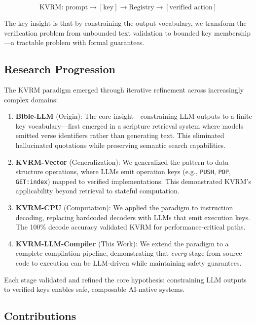 \documentclass[11pt,a4paper]{article}
\begin{document}
\begin{equation}
\text{KVRM: } \text{prompt} \rightarrow [\text{key}] \rightarrow \text{Registry} \rightarrow [\text{verified action}]
\end{equation}

The key insight is that by constraining the output vocabulary, we transform the verification problem from unbounded text validation to bounded key membership---a tractable problem with formal guarantees.

\subsection{Research Progression}

The KVRM paradigm emerged through iterative refinement across increasingly complex domains:

\begin{enumerate}
    \item \textbf{Bible-LLM} (Origin): The core insight---constraining LLM outputs to a finite key vocabulary---first emerged in a scripture retrieval system where models emitted verse identifiers rather than generating text. This eliminated hallucinated quotations while preserving semantic search capabilities.

    \item \textbf{KVRM-Vector} (Generalization): We generalized the pattern to data structure operations, where LLMs emit operation keys (e.g., \texttt{PUSH}, \texttt{POP}, \texttt{GET:index}) mapped to verified implementations. This demonstrated KVRM's applicability beyond retrieval to stateful computation.

    \item \textbf{KVRM-CPU} (Computation): We applied the paradigm to instruction decoding, replacing hardcoded decoders with LLMs that emit execution keys. The 100\% decode accuracy validated KVRM for performance-critical paths.

    \item \textbf{KVRM-LLM-Compiler} (This Work): We extend the paradigm to a complete compilation pipeline, demonstrating that \textit{every} stage from source code to execution can be LLM-driven while maintaining safety guarantees.
\end{enumerate}

Each stage validated and refined the core hypothesis: constraining LLM outputs to verified keys enables safe, composable AI-native systems.

\subsection{Contributions}
\end{document}
